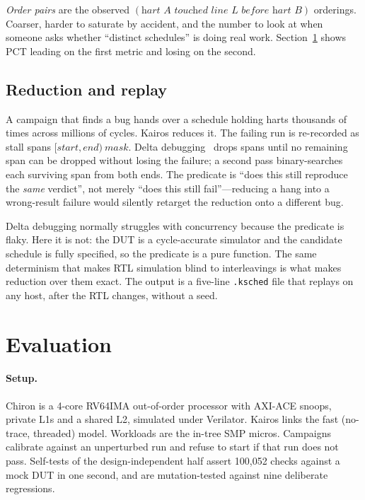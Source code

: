 \documentclass[sigconf,anonymous,review]{acmart}
\begin{document}
\emph{Order pairs} are the observed $(\textit{hart }A\textit{ touched
line }L\textit{ before hart }B)$ orderings. Coarser, harder to saturate
by accident, and the number to look at when someone asks whether
``distinct schedules'' is doing real work. Section~\ref{sec:eval}
shows PCT leading on the first metric and losing on the second.

\subsection{Reduction and replay}
\label{sec:reduce}

A campaign that finds a bug hands over a schedule holding harts
thousands of times across millions of cycles. Kairos reduces it.
The failing run is re-recorded as stall spans
$[\textit{start},\textit{end})\ \textit{mask}$. Delta
debugging~\cite{zeller2002ddmin} drops spans until no remaining span
can be dropped without losing the failure; a second pass binary-searches
each surviving span from both ends. The predicate is ``does this still
reproduce the \emph{same} verdict'', not merely ``does this still
fail''---reducing a hang into a wrong-result failure would silently
retarget the reduction onto a different bug.

Delta debugging normally struggles with concurrency because the
predicate is flaky. Here it is not: the DUT is a cycle-accurate
simulator and the candidate schedule is fully specified, so the
predicate is a pure function. The same determinism that makes RTL
simulation blind to interleavings is what makes reduction over them
exact. The output is a five-line \texttt{.ksched} file that replays
on any host, after the RTL changes, without a seed.

\section{Evaluation}
\label{sec:eval}

\paragraph{Setup.}
Chiron is a 4-core RV64IMA out-of-order processor with AXI-ACE
snoops, private L1s and a shared L2, simulated under Verilator.
Kairos links the fast (no-trace, threaded) model. Workloads are the
in-tree SMP micros. Campaigns calibrate against an unperturbed run and
refuse to start if that run does not pass. Self-tests of the
design-independent half assert 100{,}052 checks against a mock DUT in
one second, and are mutation-tested against nine deliberate regressions.
\end{document}
